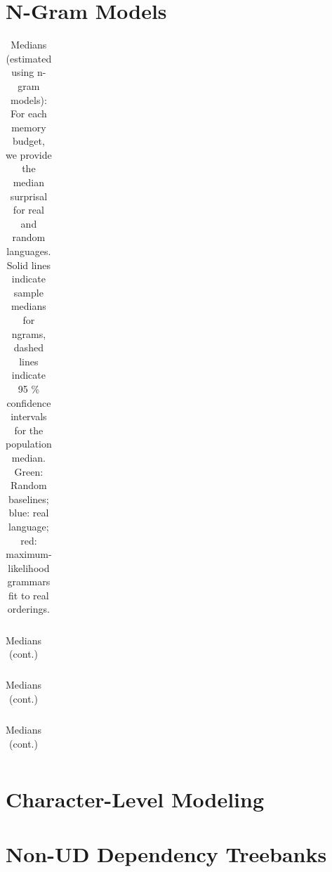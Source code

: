 \documentclass[11pt,letterpaper]{article}
\begin{document}
\section{N-Gram Models}



\begin{table}
\begin{tabular}{ccccccccccccccclll}

\end{tabular}
	\caption{Medians (estimated using n-gram models): For each memory budget, we provide the median surprisal for real and random languages. Solid lines indicate sample medians for ngrams, dashed lines indicate 95 \% confidence intervals for the population median. Green: Random baselines; blue: real language; red: maximum-likelihood grammars fit to real orderings.}\label{tab:medians_ngrams}
\end{table}

\begin{table}
\begin{tabular}{ccccccccccccccclll}

\end{tabular}
	\caption{Medians (cont.)}
\end{table}

\begin{table}
\begin{tabular}{ccccccccccccccclll}

\end{tabular}
	\caption{Medians (cont.)}
\end{table}

\begin{table}
\begin{tabular}{ccccccccccccccclll}

\end{tabular}
	\caption{Medians (cont.)}
\end{table}





%
%
%



\section{Character-Level Modeling}

\section{Non-UD Dependency Treebanks}
\end{document}
